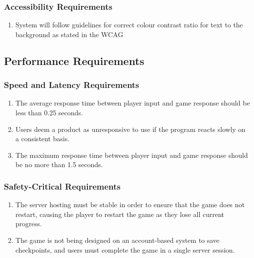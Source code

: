 \documentclass[]{article}
\begin{document}
\subsubsection{Accessibility Requirements}
\label{ssub:accessibility_requirements}
\begin{enumerate}[{UH}1. ]
	\item System will follow guidelines for correct colour contrast ratio for text to the background as stated in the WCAG ~\cite{wcag}
\end{enumerate}


\subsection{Performance Requirements}
\label{sub:performance_requirements}

\subsubsection{Speed and Latency Requirements}
\label{ssub:speed_and_latency_requirements}
\begin{enumerate}[{PR}1. ]
	\item The average response time between player input and game response should be less than 0.25 seconds. 
	\item Users deem a product as unresponsive to use if the program reacts slowly on a consistent basis.
    \item The maximum response time between player input and game response should be no more than 1.5 seconds.
\end{enumerate}

\subsubsection{Safety-Critical Requirements}
\label{ssub:safety_critical_requirements}
\begin{enumerate}[{PR}1. ]
	\item The server hosting must be stable in order to ensure that the game does not restart, causing the player to restart the game as they lose all current progress. 
	\item The game is not being designed on an account-based system to save checkpoints, and users must complete the game in a single server session.
\end{enumerate}
\end{document}
